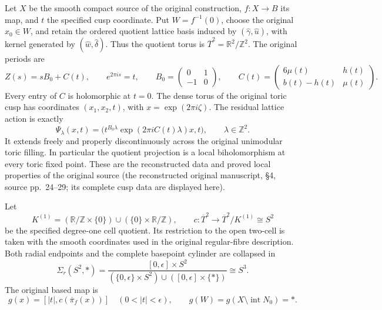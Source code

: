 Let \(X\) be the smooth compact source of the original construction,
\(f:X\to B\) its map, and \(t\) the specified cusp coordinate.
Put \(W=f^{-1}(0)\), choose the original \(x_0\in W\), and retain the
ordered quotient lattice basis induced by
\((\widehat\gamma,\widehat u)\), with kernel generated by
\((\widehat w,\widehat\delta)\). Thus the quotient torus is
\(\overline T^2=\mathbb R^2/\mathbb Z^2\). The original periods are
\begin{equation}
 Z(s)=sB_0+C(t),\qquad e^{2\pi i s}=t,\qquad
 B_0=\begin{pmatrix}0&1\\-1&0\end{pmatrix},\qquad
 C(t)=\begin{pmatrix}6\mu(t)&h(t)\\b(t)-h(t)&\mu(t)\end{pmatrix}.
 \label{wb:cusp-null:eq:periods}
\end{equation}
Every entry of \(C\) is holomorphic at \(t=0\).
The dense torus of the original toric cusp has coordinates
\((x_1,x_2,t)\), with
\(x=\exp(2\pi i\zeta)\). The residual lattice action is exactly
\begin{equation}
 \Psi_\lambda(x,t)=
 \bigl(t^{B_0\lambda}\exp(2\pi iC(t)\lambda)x,t\bigr),
 \qquad\lambda\in\mathbb Z^2.
 \label{wb:cusp-null:eq:action}
\end{equation}
It extends freely and properly discontinuously across the original
unimodular toric filling. In particular the quotient projection is a local
biholomorphism at every toric fixed point. These are the reconstructed
data and proved local properties of the original source
(the reconstructed original manuscript, \S4, source pp.~24--29; its complete cusp data are displayed here).

Let
\[
 K^{(1)}=(\mathbb R/\mathbb Z\times\{0\})\cup(\{0\}\times\mathbb R/\mathbb Z),\qquad
 c:\overline T^2\longrightarrow \overline T^2/K^{(1)}\cong S^2
\]
be the specified degree-one cell quotient. Its restriction to the open
two-cell is taken with the smooth coordinates used in the original
regular-fibre description. Both radial endpoints and the complete
basepoint cylinder are collapsed in
\[
 \Sigma_r(S^2,*)=
 \frac{[0,\epsilon]\times S^2}
 {(\{0,\epsilon\}\times S^2)\cup([0,\epsilon]\times\{*\})}
 \cong S^3.
\]
The original based map is
\begin{equation}
 g(x)=[|t|,c(\overline\pi_f(x))]\quad(0<|t|<\epsilon),\qquad
 g(W)=g(X\setminus\operatorname{int}N_0)=*.
 \label{wb:cusp-null:eq:g}
\end{equation}


